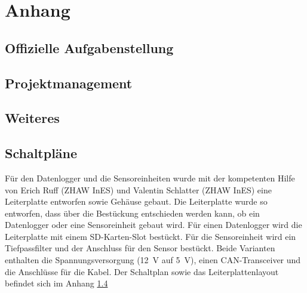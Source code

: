 %
%



\appendix
\chapter{Anhang}\label{chap.anhang}
\section{Offizielle Aufgabenstellung}\label{app.aufgabenstellung}



\section{Projektmanagement}\label{app.projektmanagement}






\section{Weiteres}\label{weiteres}


\section{Schaltpläne}\label{app.pcb}
Für den Datenlogger und die Sensoreinheiten wurde mit der kompetenten Hilfe von Erich Ruff (ZHAW InES) und Valentin Schlatter (ZHAW InES) eine Leiterplatte entworfen sowie Gehäuse gebaut. Die Leiterplatte wurde so entworfen, dass über die Bestückung entschieden werden kann, ob ein Datenlogger oder eine Sensoreinheit gebaut wird. Für einen Datenlogger wird die Leiterplatte mit einem SD-Karten-Slot bestückt. Für die Sensoreinheit wird ein Tiefpassfilter und der Anschluss für den Sensor bestückt. Beide Varianten enthalten die Spannungsversorgung (12~V auf 5~V), einen CAN-Transceiver und die Anschlüsse für die Kabel. Der Schaltplan sowie das Leiterplattenlayout befindet sich im Anhang \ref{app.pcb}




